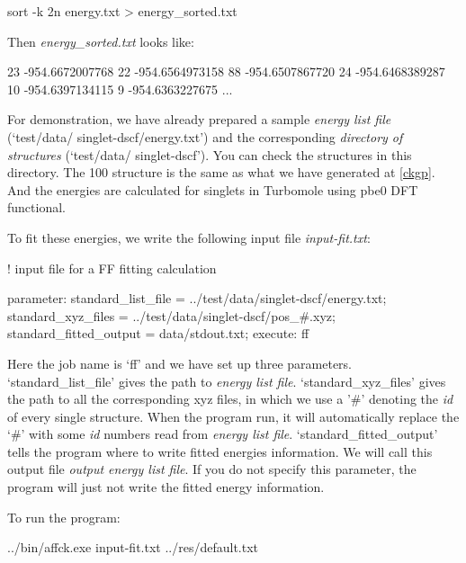 \documentclass[11pt]{book}
\begin{document}
\begin{everbatim}
sort -k 2n energy.txt > energy_sorted.txt
\end{everbatim}

Then \emph{energy\_sorted.txt} looks like:

\begin{everbatim}
23   -954.6672007768
22   -954.6564973158
88   -954.6507867720
24   -954.6468389287
10   -954.6397134115
9   -954.6363227675
...
\end{everbatim}

For demonstration, we have already prepared a sample \emph{energy list file} (`test/data/ singlet-dscf/energy.txt') 
and the corresponding \emph{directory of structures} (`test/data/ singlet-dscf'). You can check the structures in this 
directory. The 100 structure is the same as what we have generated at \ref{ckgp}. And the energies are calculated for singlets in Turbomole 
using pbe0 DFT functional.

To fit these energies, we write the following input file \emph{input-fit.txt}:

\begin{everbatim}

! input file for a FF fitting calculation

{ parameter: 
   standard_list_file     = ../test/data/singlet-dscf/energy.txt;
   standard_xyz_files     = ../test/data/singlet-dscf/pos_#.xyz;
   standard_fitted_output = data/stdout.txt;
}
{ execute: ff }

\end{everbatim}

Here the job name is `ff' and we have set up three parameters. `standard\_list\_file' gives the path to \emph{energy list file}. 
`standard\_xyz\_files' gives the path to all the corresponding xyz files, in which we use a '\#' denoting the \emph{id} of every 
single structure. When the program run, it will automatically replace the `\#' with some \emph{id} numbers read from 
\emph{energy list file}. `standard\_fitted\_output' tells the program where to write fitted energies information. We will call this
output file \emph{output energy list file}. If you do not specify this parameter, the program will just not write the fitted energy 
information.

To run the program:

\begin{everbatim}
../bin/affck.exe input-fit.txt ../res/default.txt
\end{everbatim}
\end{document}
